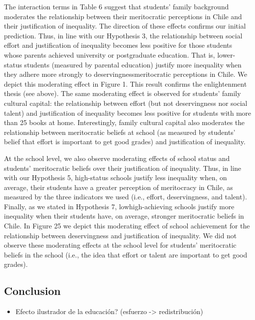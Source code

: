 \documentclass[
  letterpaper,
  DIV=11,
  numbers=noendperiod]{scrartcl}
\providecommand{\tightlist}{%
  \setlength{\itemsep}{0pt}\setlength{\parskip}{0pt}}\usepackage{longtable,booktabs,array}
\begin{document}
The interaction terms in Table 6 suggest that students' family
background moderates the relationship between their meritocratic
perceptions in Chile and their justification of inequality. The
direction of these effects confirms our initial prediction. Thus, in
line with our Hypothesis 3, the relationship between social effort and
justification of inequality becomes less positive for those students
whose parents achieved university or postgraduate education. That is,
lower-status students (measured by parental education) justify more
inequality when they adhere more strongly to deservingnessmeritocratic
perceptions in Chile. We depict this moderating effect in Figure 1. This
result confirms the enlightenment thesis (see above). The same
moderating effect is observed for students' family cultural capital: the
relationship between effort (but not deservingness nor social talent)
and justification of inequality becomes less positive for students with
more than 25 books at home. Interestingly, family cultural capital also
moderates the relationship between meritocratic beliefs at school (as
measured by students' belief that effort is important to get good
grades) and justification of inequality.

At the school level, we also observe moderating effects of school status
and students' meritocratic beliefs over their justification of
inequality. Thus, in line with our Hypothesis 5, high-status schools
justify less inequality when, on average, their students have a greater
perception of meritocracy in Chile, as measured by the three indicators
we used (i.e., effort, deservingness, and talent). Finally, as we stated
in Hypothesis 7, lowhigh-achieving schools justify more inequality when
their students have, on average, stronger meritocratic beliefs in Chile.
In Figure 25 we depict this moderating effect of school achievement for
the relationship between deservingness and justification of inequality.
We did not observe these moderating effects at the school level for
students' meritocratic beliefs in the school (i.e., the idea that effort
or talent are important to get good grades).

\subsection{Conclusion}\label{conclusion}

\begin{itemize}
\tightlist
\item
  Efecto ilustrador de la educación? (esfuerzo -\textgreater{}
  redistribución)
\end{itemize}
\end{document}
